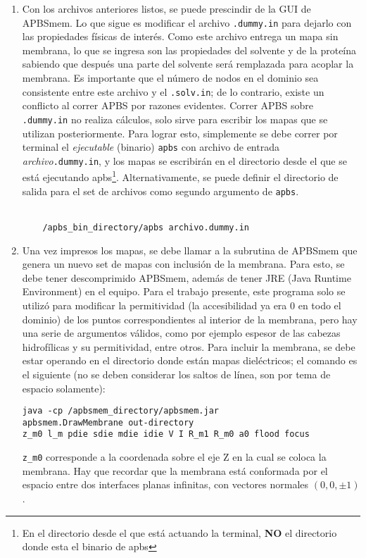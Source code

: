 \begin{enumerate}
	\item Con los archivos anteriores listos, se puede prescindir de la GUI de APBSmem. Lo que sigue es modificar el archivo \texttt{.dummy.in} para dejarlo con las propiedades físicas de interés. Como este archivo entrega un mapa sin membrana, lo que se ingresa son las propiedades del solvente y de la proteína sabiendo que después una parte del solvente será remplazada para acoplar la membrana. Es importante que el número de nodos en el dominio sea consistente entre este archivo y el \texttt{.solv.in}; de lo contrario, existe un conflicto al correr APBS por razones evidentes. Correr APBS sobre \texttt{.dummy.in} no realiza cálculos, solo sirve para escribir los mapas que se utilizan posteriormente. Para lograr esto, simplemente se debe correr por terminal el \textit{ejecutable} (binario) \texttt{apbs} con archivo de entrada \textit{archivo}\texttt{.dummy.in}, y los mapas se escribirán en el directorio desde el que se está ejecutando apbs\footnote{En el directorio desde el que está actuando la terminal, \textbf{NO} el directorio donde esta el binario de apbs}. Alternativamente, se puede definir el directorio de salida para el set de archivos como segundo argumento de \texttt{apbs}.\\\\
	\begin{lstlisting}
	/apbs_bin_directory/apbs archivo.dummy.in
	\end{lstlisting}
	\item Una vez impresos los mapas, se debe llamar a la subrutina de APBSmem que genera un nuevo set de mapas con inclusión de la membrana. Para esto, se debe tener descomprimido APBSmem, además de tener JRE (Java Runtime Environment) en el equipo. Para el trabajo presente, este programa solo se utilizó para modificar la permitividad (la accesibilidad ya era $0$ en todo el dominio) de los puntos correspondientes al interior de la membrana, pero hay una serie de argumentos válidos, como por ejemplo espesor de las cabezas hidrofílicas y su permitividad, entre otros. Para incluir la membrana, se debe estar operando en el directorio donde están mapas dieléctricos; el comando es el siguiente (no se deben considerar los saltos de línea, son por tema de espacio solamente):
	\begin{lstlisting}
java -cp /apbsmem_directory/apbsmem.jar
apbsmem.DrawMembrane out-directory
z_m0 l_m pdie sdie mdie idie V I R_m1 R_m0 a0 flood focus
	\end{lstlisting}
	\texttt{z\_m0} corresponde a la coordenada sobre el eje Z en la cual se coloca la membrana. Hay que recordar que la membrana está conformada por el espacio entre dos interfaces planas infinitas, con vectores normales $(0, 0, \pm 1)$.\\

\end{enumerate}
